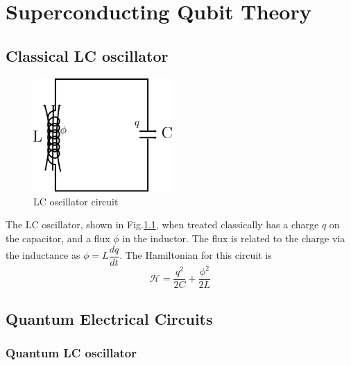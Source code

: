 
\chapter{Superconducting Qubit Theory} %

\label{Chapter3} %

\section{Classical LC oscillator}

\begin{figure}
\centering
\includegraphics[width=150pt]{Figures/LC_oscillator}
\decoRule
\caption[LC oscillator]{LC oscillator circuit}
\label{fig:LC oscillator}
\end{figure}

The LC oscillator, shown in Fig.\ref{fig:LC oscillator}, when treated classically has a charge $q$ on the capacitor, and a flux $\phi$ in the inductor. The flux is related to the charge via the inductance as $\phi=L\dfrac{dq}{dt}$. The Hamiltonian for this circuit is
\begin{equation}
\mathcal{H}=\frac{q^2}{2C}+\frac{\phi^2}{2L}
\end{equation}

\section{Quantum Electrical Circuits}

\subsection{Quantum LC oscillator}

